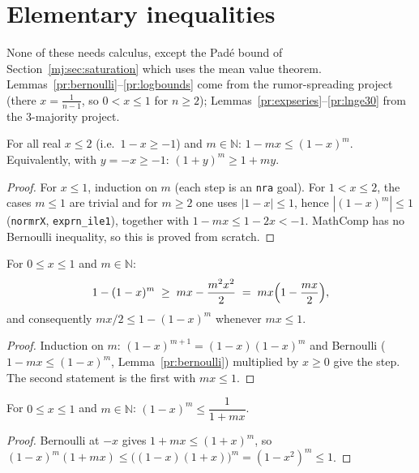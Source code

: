 \section{Elementary inequalities}\label{pr:sec:ineq}

None of these needs calculus, except the Pad\'e bound of
Section~\ref{mj:sec:saturation} which uses the mean value theorem.
Lemmas~\ref{pr:bernoulli}--\ref{pr:logbounds} come from the rumor-spreading
project (there $x = \tfrac{1}{n-1}$, so $0 < x \le 1$ for $n \ge 2$);
Lemmas~\ref{pr:expseries}--\ref{pr:lnge30} from the 3-majority project.

\begin{lemma}[Bernoulli]\label{pr:bernoulli}
  \rocqok
  For all real $x \le 2$ (i.e.\ $1 - x \ge -1$) and $m \in \mathbb{N}$:
  $1 - mx \le (1-x)^m$. Equivalently, with $y = -x \ge -1$:
  $(1+y)^m \ge 1 + my$.
\end{lemma}
\begin{proof}
  \rocqok
  For $x \le 1$, induction on $m$ (each step is an \texttt{nra} goal). For
  $1 < x \le 2$, the cases $m \le 1$ are trivial and for $m \ge 2$ one uses
  $|1 - x| \le 1$, hence $|(1-x)^m| \le 1$ (\texttt{normrX},
  \texttt{exprn\_ile1}), together with $1 - mx \le 1 - 2x < -1$. MathComp
  has no Bernoulli inequality, so this is proved from scratch.
\end{proof}

\begin{lemma}\label{pr:bonferroni}
  \rocqok
  For $0 \le x \le 1$ and $m \in \mathbb{N}$:
  \[
    1-(1-x)^m \;\ge\; mx - \frac{m^2x^2}{2} \;=\; mx\Bigl(1-\frac{mx}{2}\Bigr),
  \]
  and consequently $mx/2 \le 1-(1-x)^m$ whenever $mx \le 1$.
\end{lemma}
\begin{proof}
  \rocqok
  Induction on $m$: $(1-x)^{m+1} = (1-x)(1-x)^m$ and Bernoulli
  ($1 - mx \le (1-x)^m$, Lemma~\ref{pr:bernoulli}) multiplied by $x \ge 0$
  give the step. The second statement is the first with $mx \le 1$.
\end{proof}

\begin{lemma}\label{pr:upper}
  \rocqok
  For $0 \le x \le 1$ and $m \in \mathbb{N}$: $(1-x)^m \le \dfrac{1}{1+mx}$.
\end{lemma}
\begin{proof}
  \rocqok
  Bernoulli at $-x$ gives $1 + mx \le (1+x)^m$, so
  $(1-x)^m (1 + mx) \le \bigl((1-x)(1+x)\bigr)^m = (1-x^2)^m \le 1$.
\end{proof}

